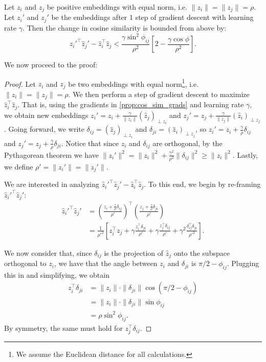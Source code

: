 Let $z_i$ and $z_j$ be positive embeddings with equal norm, i.e. $\|z_i\| = \|z_j\| = \rho$. Let $z_i'$ and $z_j'$ be the embeddings after 1 step of gradient descent with learning rate $\gamma$. Then the change in cosine similarity is bounded from above by:
\begin{equation*}
    \hat{z}_i'^\top \hat{z}_j' - \hat{z}_i^\top \hat{z}_j < \frac{\gamma \sin^2 \phi_{ij}}{\rho^2} \left[ 2 - \frac{\gamma \cos \phi}{\rho^2} \right].
\end{equation*}

\noindent We now proceed to the proof:
\begin{proof}
    Let $z_i$ and $z_j$ be two embeddings with equal norm\footnote{We assume the Euclidean distance for all calculations.}, i.e. $\|z_i\| = \|z_j\| = \rho$. We then perform a step of gradient descent to maximize $\hat{z}_i^\top \hat{z}_j$. That is, using the gradients in \ref{prop:cos_sim_grads} and learning rate $\gamma$, we obtain new embeddings $z_i' = z_i + \frac{\gamma}{\|z_i\|} (\hat{z}_j)_{\perp z_i}$ and $z_j' = z_j + \frac{\gamma}{\|z_j\|} (\hat{z}_i)_{\perp z_j}$. Going forward, we write $\delta_{ij} = (\hat{z}_j)_{\perp z_i}$ and $\delta_{ji} = (\hat{z}_i)_{\perp z_j}$, so $z_i' = z_i + \frac{\gamma}{\rho} \delta_{ij}$ and $z_j' = z_j + \frac{\gamma}{\rho} \delta_{ji}$. Notice that since $z_i$ and $\delta_{ij}$ are orthogonal, by the Pythagorean theorem we have $\|z_i'\|^2 = \|z_i\|^2 + \frac{\gamma^2}{\rho^2}\|\delta_{ij}\|^2 \geq \|z_i\|^2$. Lastly, we define $\rho' = \|z_i'\| = \|z_j'\|$.

    We are interested in analyzing $\hat{z}_i'^\top \hat{z}_j' - \hat{z}_i^\top \hat{z}_j$. To this end, we begin by re-framing $\hat{z}_i'^\top \hat{z}_j'$:
    \begin{align*}
        \hat{z}_i'^\top \hat{z}_j' &= \left(\frac{z_i + \frac{\gamma}{\rho} \delta_{ij}}{\rho'}\right)^\top \left(\frac{z_j + \frac{\gamma}{\rho} \delta_{ji}}{\rho'}\right) \\
        &= \frac{1}{\rho'^2}\left[ z_i^\top z_j + \gamma \frac{z_i^\top \delta_{ji}}{\rho'} + \gamma \frac{z_j^\top \delta_{ij}}{\rho'} + \gamma^2 \frac{\delta_{ij}^\top \delta_{ji}}{\rho'^2} \right].
    \end{align*}

    We now consider that, since $\delta_{ij}$ is the projection of $\hat{z}_j$ onto the subspace orthogonal to $z_i$, we have that the angle between $z_i$ and $\delta_{ji}$ is $\pi/2 - \phi_{ij}$. Plugging this in and simplifying, we obtain
    \begin{align*}
        z_i^\top \delta_{ji} &= \|z_i\| \cdot \|\delta_{ji}\| \cos (\pi/2 - \phi_{ij}) \\
        &= \|z_i\| \cdot \|\delta_{ji}\| \sin \phi_{ij} \\
        &= \rho \sin^2 \phi_{ij}.
    \end{align*}
    By symmetry, the same must hold for $z_j^\top \delta_{ij}$.
    

\end{proof}
